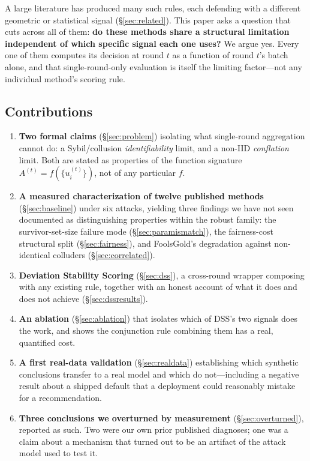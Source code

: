 \documentclass[11pt,a4paper]{article}
\begin{document}
A large literature has produced many such rules, each defending with a
different geometric or statistical signal (\S\ref{sec:related}). This
paper asks a question that cuts across all of them: \textbf{do these
methods share a structural limitation independent of which specific
signal each one uses?} We argue yes. Every one of them computes its
decision at round $t$ as a function of round $t$'s batch alone, and that
single-round-only evaluation is itself the limiting factor---not any
individual method's scoring rule.

\subsection{Contributions}

\begin{enumerate}
  \item \textbf{Two formal claims} (\S\ref{sec:problem}) isolating what
    single-round aggregation cannot do: a Sybil/collusion
    \emph{identifiability} limit, and a non-IID \emph{conflation} limit.
    Both are stated as properties of the function signature
    $A^{(t)} = f(\{u_i^{(t)}\})$, not of any particular $f$.

  \item \textbf{A measured characterization of twelve published methods}
    (\S\ref{sec:baseline}) under six attacks, yielding three findings we
    have not seen documented as distinguishing properties within the
    robust family: the survivor-set-size failure mode
    (\S\ref{sec:paramismatch}), the fairness-cost structural split
    (\S\ref{sec:fairness}), and FoolsGold's degradation against
    non-identical colluders (\S\ref{sec:correlated}).

  \item \textbf{Deviation Stability Scoring} (\S\ref{sec:dss}), a
    cross-round wrapper composing with any existing rule, together with
    an honest account of what it does and does not achieve
    (\S\ref{sec:dssresults}).

  \item \textbf{An ablation} (\S\ref{sec:ablation}) that isolates which of
    DSS's two signals does the work, and shows the conjunction rule
    combining them has a real, quantified cost.

  \item \textbf{A first real-data validation} (\S\ref{sec:realdata})
    establishing which synthetic conclusions transfer to a real model and
    which do not---including a negative result about a shipped default
    that a deployment could reasonably mistake for a recommendation.

  \item \textbf{Three conclusions we overturned by measurement}
    (\S\ref{sec:overturned}), reported as such. Two were our own prior
    published diagnoses; one was a claim about a mechanism that turned out
    to be an artifact of the attack model used to test it.
\end{enumerate}
\end{document}
